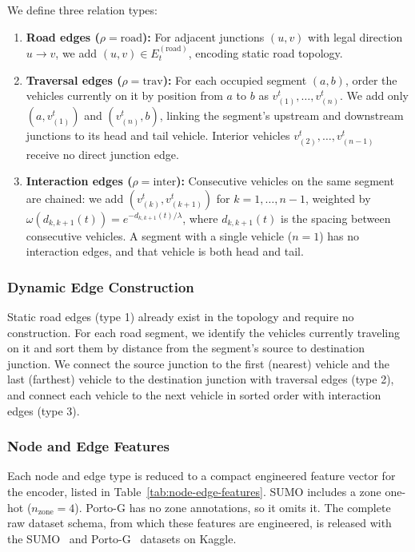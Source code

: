 We define three relation types:
\begin{enumerate}
    \item \textbf{Road edges ($\rho=\text{road}$):} For adjacent junctions $(u,v)$ with legal direction $u\!\to\!v$, we add $(u,v)\in E_t^{(\text{road})}$, encoding static road topology.
    \item \textbf{Traversal edges ($\rho=\text{trav}$):} For each occupied segment $(a,b)$, order the vehicles currently on it by position from $a$ to $b$ as $v_{(1)}^t,\dots,v_{(n)}^t$. We add only $(a, v_{(1)}^t)$ and $(v_{(n)}^t, b)$, linking the segment's upstream and downstream junctions to its head and tail vehicle. Interior vehicles $v_{(2)}^t,\dots,v_{(n-1)}^t$ receive no direct junction edge.
    \item \textbf{Interaction edges ($\rho=\text{inter}$):} Consecutive vehicles on the same segment are chained: we add $(v_{(k)}^t, v_{(k+1)}^t)$ for $k=1,\dots,n-1$, weighted by $\omega(d_{k,k+1}(t)) = e^{-d_{k,k+1}(t)/\lambda}$, where $d_{k,k+1}(t)$ is the spacing between consecutive vehicles. A segment with a single vehicle ($n{=}1$) has no interaction edges, and that vehicle is both head and tail.
\end{enumerate}

\subsubsection{Dynamic Edge Construction}
Static road edges (type 1) already exist in the topology and require no construction. For each road segment, we identify the vehicles currently traveling on it and sort them by distance from the segment's source to destination junction. We connect the source junction to the first (nearest) vehicle and the last (farthest) vehicle to the destination junction with traversal edges (type 2), and connect each vehicle to the next vehicle in sorted order with interaction edges (type 3).

\subsubsection{Node and Edge Features}
Each node and edge type is reduced to a compact engineered feature vector for the encoder, listed in Table~\ref{tab:node-edge-features}. SUMO includes a zone one-hot ($n_{\mathrm{zone}}{=}4$). Porto-G has no zone annotations, so it omits it. The complete raw dataset schema, from which these features are engineered, is released with the SUMO~\cite{tordjman2026sumokaggle} and Porto-G~\cite{tordjman2026portokaggle} datasets on Kaggle.

